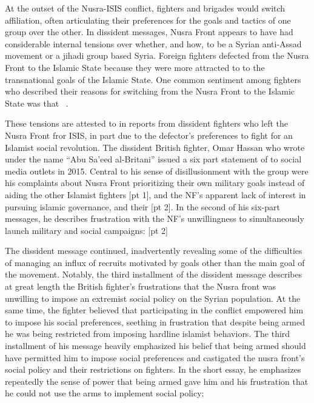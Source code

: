 At the outset of the Nusra-ISIS conflict, fighters and brigades would switch affiliation, often articulating their preferences for the goals and tactics of one group over the other.  In dissident messages, Nusra Front appears to have had considerable internal tensions over whether, and how, to be a Syrian anti-Assad movement or a jihadi group based Syria. Foreign fighters defected from the Nusra Front to the Islamic State because they were more attracted to to the transnational goals of the Islamic State. One common sentiment among fighters who described their reasons for switching from the Nusra Front to the Islamic State was that ~\autocite[127]{mironova2019freedom}.

 These tensions are attested to in reports from dissident fighters who left the Nusra Front fror ISIS, in part due to the defector’s preferences to fight for an Islamist social revolution. The dissident British fighter, Omar Hassan who wrote under the name “Abu Sa’eed al-Britani” issued a six part statement of  to social media outlets in 2015. Central to his sense of disillusionment with the group were his complaints about Nusra Front prioritizing their own military goals instead of aiding the other Islamist fighters [pt 1], and the  NF’s apparent lack of interest in pursuing islamic governance, and their  [pt 2].  In the second of his six-part messages, he describes frustration with the NF’s unwillingness to simultaneously launch military and social campaigns: [pt 2]

The dissident message continued, inadvertently revealing some of the difficulties of managing an influx of recruits motivated by goals other than the main goal of the movement. Notably, the third installment of the dissident message describes at great length the British fighter’s frustrations that the Nusra front was unwilling to impose an extremist social policy on the Syrian population. At the same time, the fighter believed that participating in the conflict empowered him to impose his social preferences, seething in frustration that despite being armed he was being restricted from imposing hardline islamist behaviors. The third installment of his message heavily emphasized his belief that being armed should have permitted him to impose social preferences and castigated the nusra front’s social policy and their restrictions on fighters. In the short essay, he emphasizes repeatedly the sense of power that being armed gave him and his frustration that he could not use the arms to implement social policy;

